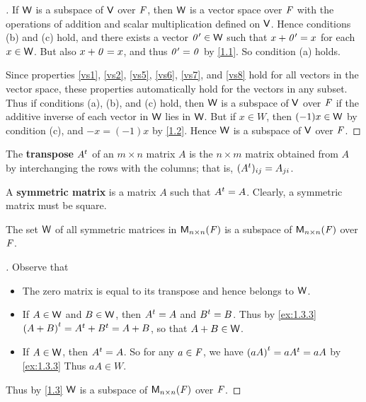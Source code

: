 \begin{proof}[]
	If \(\mathsf{W}\) is a subspace of \(\mathsf{V}\) over \(\mathit{F}\), then \(\mathsf{W}\) is a vector space over \(\mathit{F}\) with the operations of addition and scalar multiplication defined on \(\mathsf{V}\).
	Hence conditions (b) and (c) hold, and there exists a vector \(\mathit{0}' \in \mathsf{W}\) such that \(x + \mathit{0}' = x\) for each \(x \in \mathsf{W}\).
	But also \(x + \mathit{0} = x\), and thus \(\mathit{0}' = \mathit{0}\) by \cref{1.1}.
	So condition (a) holds.

	Since properties \ref{vs1}, \ref{vs2}, \ref{vs5}, \ref{vs6}, \ref{vs7}, and \ref{vs8} hold for all vectors in the vector space, these properties automatically hold for the vectors in any subset.
	Thus if conditions (a), (b), and (c) hold, then \(\mathsf{W}\) is a subspace of \(\mathsf{V}\) over \(\mathit{F}\) if the additive inverse of each vector in \(\mathsf{W}\) lies in \(\mathsf{W}\).
	But if \(x \in W\), then \((-1) x \in \mathsf{W}\) by condition (c), and \(-x = (-1) x\) by \cref{1.2}.
	Hence \(\mathsf{W}\) is a subspace of \(\mathsf{V}\) over \(\mathit{F}\).
\end{proof}

\begin{defn}\label{1.3.3}
	The \textbf{transpose} \({A}^{t}\) of an \(m \times n\) matrix \(A\) is the \(n \times m\) matrix obtained from \(A\) by interchanging the rows with the columns;
	that is, \(({A}^{t})_{i j} = A_{j i}\).
\end{defn}

\begin{defn}\label{1.3.4}
	A \textbf{symmetric matrix} is a matrix \(A\) such that \({A}^{t} = A\).
	Clearly, a symmetric matrix must be square.
\end{defn}

\begin{eg}\label{1.3.5}
	The set \(\mathsf{W}\) of all symmetric matrices in \(\mathsf{M}_{{n} \times n}({\mathit{F}})\) is a subspace of \(\mathsf{M}_{{n} \times n}({\mathit{F}})\) over \(\mathit{F}\).
\end{eg}

\begin{proof}[]
	Observe that
	\begin{itemize}
		\item The zero matrix is equal to its transpose and hence belongs to \(\mathsf{W}\).
		\item If \(A \in \mathsf{W}\) and \(B \in \mathsf{W}\), then \({A}^{t} = A\) and \({B}^{t} = B\).
		      Thus by \cref{ex:1.3.3} \({(A + B)}^{t} = {A}^{t} + {B}^{t} = A + B\), so that \(A + B \in \mathsf{W}\).
		\item If \(A \in \mathsf{W}\), then \({A}^{t} = A\).
		      So for any \(a \in \mathit{F}\), we have \({(aA)}^{t} = a{A}^{t} = aA\) by \cref{ex:1.3.3}
		      Thus \(aA \in W\).
	\end{itemize}
	Thus by \cref{1.3} \(\mathsf{W}\) is a subspace of \(\mathsf{M}_{{n} \times n}({\mathit{F}})\) over \(\mathit{F}\).
\end{proof}

